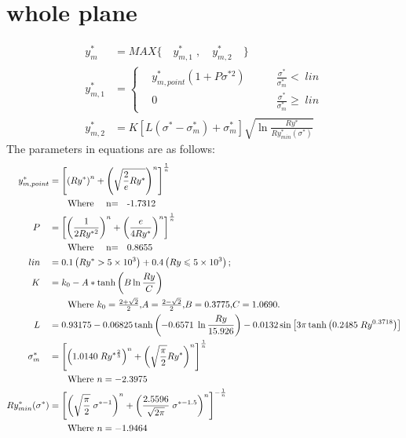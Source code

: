 \documentclass[review, 1p, number, sort&compress,table]{elsarticle}
\begin{document}
   
   
	\section{whole plane}
		\begin{align}  
		y_m^*\;  & =  MAX\{ \quad y_{m,1}^* \; , \quad  y_{m,2}^* \quad \}
			\\\nonumber
		y_{m,1}^*& =\left\{
				\begin{aligned}
					& y_{m,point}^*\left(1+P\sigma^{*2}\right)  \qquad 
					      &\frac{\sigma^*}{\sigma^*_m}   <    \;    lin\\
				    & 0   &\frac{\sigma^*}{\sigma^*_m}   \geq \;    lin
				\end{aligned}
				\right.
			\\ \nonumber
		y_{m,2}^*& = K\left[L\left(\sigma^*-\sigma^{*}_m\right)+\sigma^{*}_m 	\right]\sqrt{\ln{\frac{Ry^{*}}{Ry_{min}^{*}(\sigma^{*})}}}
		\end{align} 
		The parameters in equations are as follows:
		\begin{align}
		\nonumber
			y_{m,point}^* &=\left[\left(Ry^*\right)^n+  \left( \sqrt{\frac{2}{e}Ry^{*}}\right)^n  \right]^{\frac{1}{n}}    
			\\ \nonumber &\quad \quad \mbox{\mbox{Where}  \quad  n= \; -1.7312}
			\\ \nonumber
			P \quad      & =\left[\left( \frac{1}{2Ry^{*2}}\right)^n+  \left( \frac{e}{4Ry^{*}}\right)^n  \right]^{\frac{1}{n}}    
			\\ \nonumber &\quad \quad \mbox{\mbox{Where}  \quad  n= \; 0.8655}
			\\  \nonumber 
			lin \quad      & =0.1\left(Ry^*>5\times10^3\right)+0.4\left(Ry\leqslant5\times10^3\right);   
			\\ \nonumber
			K \quad      &=k_0-A*\tanh{\left(B\ln{\frac{Ry}{C}}\right)}
			\\ \nonumber & \quad \quad \mbox{Where $k_0=\frac{2+\sqrt{2}}{2}$,$A=\frac{2-\sqrt{2}}{2}$,$B=0.3775$,$C=1.0690$.} 
			\\ \nonumber
			L \quad     &= 
			0.93175-0.06825\tanh\left({-0.6571 \; \ln\dfrac{Ry}{15.926}}\right)-0.0132\sin\left[3{\pi}\tanh\left(0.2485 \; Ry^{0.3718}\right)\right]
			\\ \nonumber
			\sigma^{*}_{m}\quad & =\left[ \left( 1.0140 \; Ry^{*\frac{2}{3}}\right)^n+ \left( \sqrt{\frac{\pi}{2}}Ry^{*}\right)^n\right]^\frac{1}{n}
			\\ \nonumber & \quad \quad\mbox{Where $n=-2.3975$}				
			\\ \nonumber
			Ry_{min}^{*}(\sigma^{*})& = \left[ \left( \sqrt{\frac{\pi}{2}}    \; \sigma^{*-1}\right)^n+ \left(\frac{2.5596}{\sqrt{2\pi}} \; \sigma^{*-1.5}\right)^n\right]^{-\frac{1}{n}}	
			\\ \nonumber
				       & \quad \quad \mbox{Where $n=-1.9464$}
		\end{align}
\end{document}
